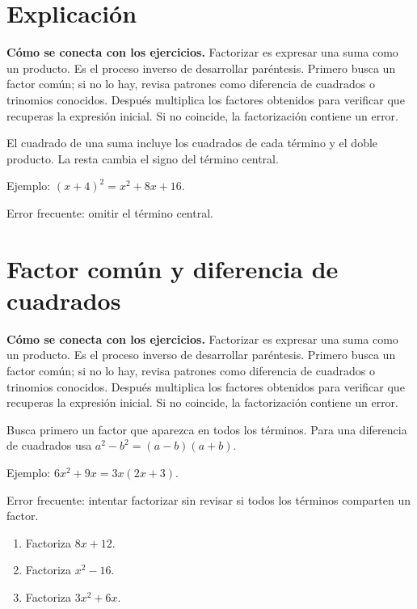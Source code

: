 \documentclass[10pt,oneside,openany]{book}
\begin{document}
\section{Explicación}

\textbf{Cómo se conecta con los ejercicios.} Factorizar es expresar una suma como un producto. Es el proceso inverso de desarrollar paréntesis. Primero busca un factor común; si no lo hay, revisa patrones como diferencia de cuadrados o trinomios conocidos. Después multiplica los factores obtenidos para verificar que recuperas la expresión inicial. Si no coincide, la factorización contiene un error.

El cuadrado de una suma incluye los cuadrados de cada término y el doble producto. La resta cambia el signo del término central.



\begin{ejemplo}
Ejemplo: $(x+4)^2=x^2+8x+16$.
\end{ejemplo}

\begin{ojo}
Error frecuente: omitir el término central.
\end{ojo}



\section{Factor común y diferencia de cuadrados}

\textbf{Cómo se conecta con los ejercicios.} Factorizar es expresar una suma como un producto. Es el proceso inverso de desarrollar paréntesis. Primero busca un factor común; si no lo hay, revisa patrones como diferencia de cuadrados o trinomios conocidos. Después multiplica los factores obtenidos para verificar que recuperas la expresión inicial. Si no coincide, la factorización contiene un error.

Busca primero un factor que aparezca en todos los términos. Para una diferencia de cuadrados usa $a^2-b^2=(a-b)(a+b)$.

\begin{ejemplo}
Ejemplo: $6x^2+9x=3x(2x+3)$.
\end{ejemplo}

\begin{ojo}
Error frecuente: intentar factorizar sin revisar si todos los términos comparten un factor.
\end{ojo}

\begin{practica}

\begin{enumerate}

\item Factoriza $8x+12$.

\item Factoriza $x^2-16$.

\item Factoriza $3x^2+6x$.

\end{enumerate}

\end{practica}
\end{document}
